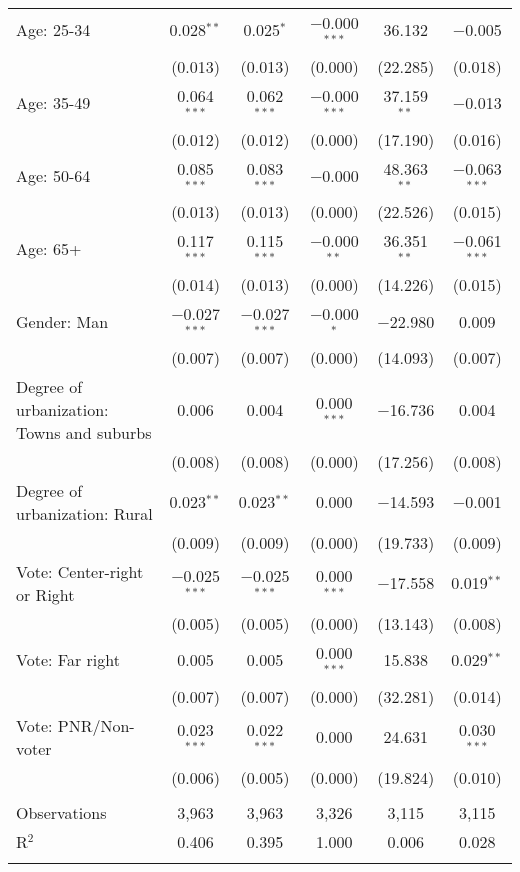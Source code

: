 \begin{tabular}{@{\extracolsep{5pt}}lccccc}
  Age: 25\mbox{-}34 & 0.028$^{**}$ & 0.025$^{*}$ & $-$0.000$^{***}$ & 36.132 & $-$0.005 \\ 
  & (0.013) & (0.013) & (0.000) & (22.285) & (0.018) \\ 
  Age: 35\mbox{-}49 & 0.064$^{***}$ & 0.062$^{***}$ & $-$0.000$^{***}$ & 37.159$^{**}$ & $-$0.013 \\ 
  & (0.012) & (0.012) & (0.000) & (17.190) & (0.016) \\ 
  Age: 50\mbox{-}64 & 0.085$^{***}$ & 0.083$^{***}$ & $-$0.000 & 48.363$^{**}$ & $-$0.063$^{***}$ \\ 
  & (0.013) & (0.013) & (0.000) & (22.526) & (0.015) \\ 
  Age: 65+ & 0.117$^{***}$ & 0.115$^{***}$ & $-$0.000$^{**}$ & 36.351$^{**}$ & $-$0.061$^{***}$ \\ 
  & (0.014) & (0.013) & (0.000) & (14.226) & (0.015) \\ 
  Gender: Man & $-$0.027$^{***}$ & $-$0.027$^{***}$ & $-$0.000$^{*}$ & $-$22.980 & 0.009 \\ 
  & (0.007) & (0.007) & (0.000) & (14.093) & (0.007) \\ 
  Degree of urbanization: Towns and suburbs & 0.006 & 0.004 & 0.000$^{***}$ & $-$16.736 & 0.004 \\ 
  & (0.008) & (0.008) & (0.000) & (17.256) & (0.008) \\ 
  Degree of urbanization: Rural & 0.023$^{**}$ & 0.023$^{**}$ & 0.000 & $-$14.593 & $-$0.001 \\ 
  & (0.009) & (0.009) & (0.000) & (19.733) & (0.009) \\ 
  Vote: Center\mbox{-}right or Right & $-$0.025$^{***}$ & $-$0.025$^{***}$ & 0.000$^{***}$ & $-$17.558 & 0.019$^{**}$ \\ 
  & (0.005) & (0.005) & (0.000) & (13.143) & (0.008) \\ 
  Vote: Far right & 0.005 & 0.005 & 0.000$^{***}$ & 15.838 & 0.029$^{**}$ \\ 
  & (0.007) & (0.007) & (0.000) & (32.281) & (0.014) \\ 
  Vote: PNR\slash Non\mbox{-}voter & 0.023$^{***}$ & 0.022$^{***}$ & 0.000 & 24.631 & 0.030$^{***}$ \\ 
  & (0.006) & (0.005) & (0.000) & (19.824) & (0.010) \\ 
 \hline \\[-1.8ex] 

Observations & 3,963 & 3,963 & 3,326 & 3,115 & 3,115 \\ 
R$^{2}$ & 0.406 & 0.395 & 1.000 & 0.006 & 0.028 \\ 
\hline 
\hline \\[-1.8ex] 
\end{tabular} 